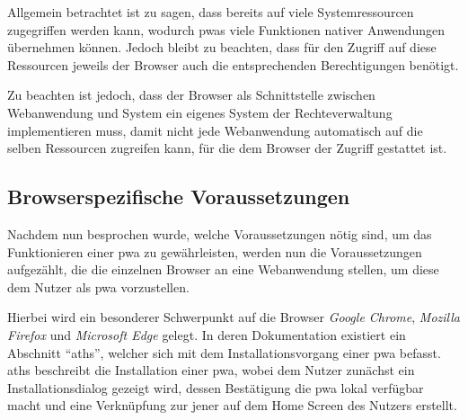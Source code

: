 \documentclass[12pt, parskip=half]{scrartcl}       %
\begin{document}
Allgemein betrachtet ist zu sagen, dass bereits auf viele Systemressourcen zugegriffen werden kann, wodurch \acp{pwa} viele Funktionen nativer Anwendungen übernehmen können.
Jedoch bleibt zu beachten, dass für den Zugriff auf diese Ressourcen jeweils der Browser auch die entsprechenden Berechtigungen benötigt.

Zu beachten ist jedoch, dass der Browser als Schnittstelle zwischen Webanwendung und System ein eigenes System der Rechteverwaltung implementieren muss, damit nicht jede Webanwendung automatisch auf die selben Ressourcen zugreifen kann, für die dem Browser der Zugriff gestattet ist.


\subsection{Browserspezifische Voraussetzungen}

Nachdem nun besprochen wurde, welche Voraussetzungen nötig sind, um das Funktionieren einer \ac{pwa} zu gewährleisten, werden nun die Voraussetzungen aufgezählt, die die einzelnen Browser an eine Webanwendung stellen, um diese dem Nutzer als \ac{pwa} vorzustellen.

Hierbei wird ein besonderer Schwerpunkt auf die Browser \textit{Google Chrome}, \textit{Mozilla Firefox} und \textit{Microsoft Edge} gelegt.
In deren Dokumentation\cite{googledev_pwainstallcriteria,docsmicrosoft_pwainstallcriteria,mozilladev_pwainstallcriteria} existiert ein Abschnitt \enquote{\ac{aths}}, welcher sich mit dem Installationsvorgang einer \ac{pwa} befasst.
\ac{aths} beschreibt die Installation einer \ac{pwa}, wobei dem Nutzer zunächst ein Installationsdialog gezeigt wird, dessen Bestätigung die \ac{pwa} lokal verfügbar macht und eine Verknüpfung zur jener auf dem Home Screen des Nutzers erstellt.
\end{document}
